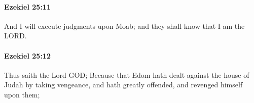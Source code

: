		\paragraph{Ezekiel 25:11} %
			\label{EZEKIEL-25-11}

			And I will execute judgments upon Moab; and they shall know that I am the LORD.


		\paragraph{Ezekiel 25:12} %
			\label{EZEKIEL-25-12}

			Thus saith the Lord GOD; Because that Edom hath dealt against the house of Judah by taking vengeance, and hath greatly offended, and revenged himself upon them;


